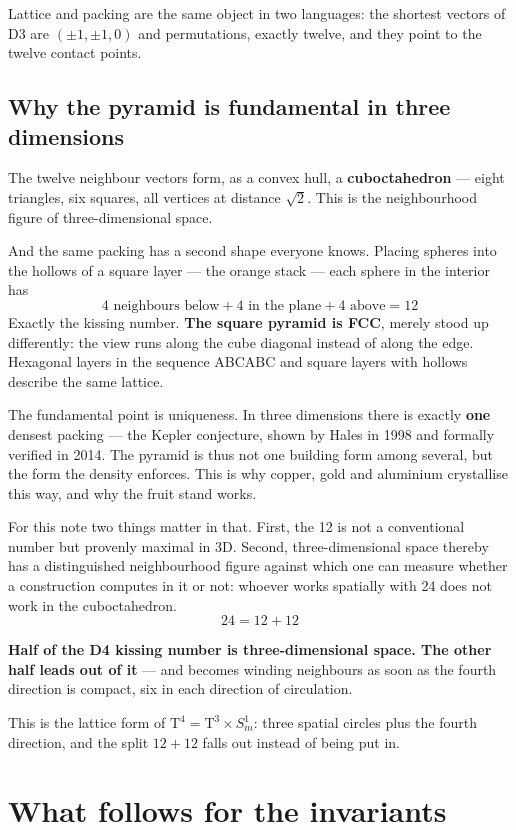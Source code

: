 \documentclass[11pt]{report}
\begin{document}
Lattice and packing are the same object in two languages: the shortest
vectors of D3 are $(\pm1, \pm1, 0)$ and permutations, exactly twelve,
and they point to the twelve contact points.

\section{Why the pyramid is fundamental in three dimensions}

The twelve neighbour vectors form, as a convex hull, a
\textbf{cuboctahedron} --- eight triangles, six squares, all vertices
at distance $\sqrt2$. This is the neighbourhood figure of
three-dimensional space.

And the same packing has a second shape everyone knows. Placing spheres
into the hollows of a square layer --- the orange stack --- each sphere
in the interior has
\[
  4 \text{ neighbours below} + 4 \text{ in the plane}
  + 4 \text{ above} = 12
\]
Exactly the kissing number. \textbf{The square pyramid is FCC}, merely
stood up differently: the view runs along the cube diagonal instead of
along the edge. Hexagonal layers in the sequence ABCABC and square
layers with hollows describe the same lattice.

The fundamental point is uniqueness. In three dimensions there is
exactly \textbf{one} densest packing --- the Kepler conjecture, shown
by Hales in 1998 and formally verified in 2014. The pyramid is thus not
one building form among several, but the form the density enforces.
This is why copper, gold and aluminium crystallise this way, and why
the fruit stand works.

For this note two things matter in that. First, the 12 is not a
conventional number but provenly maximal in 3D. Second,
three-dimensional space thereby has a distinguished neighbourhood
figure against which one can measure whether a construction computes in
it or not: whoever works spatially with 24 does not work in the
cuboctahedron.
\[
  24 = 12 + 12
\]

\textbf{Half of the D4 kissing number is three-dimensional space. The
other half leads out of it} --- and becomes winding neighbours as soon
as the fourth direction is compact, six in each direction of
circulation.

This is the lattice form of
$\text{T}^4 = \text{T}^3 \times S^1_m$: three spatial circles plus the
fourth direction, and the split $12 + 12$ falls out instead of being
put in.

\chapter{What follows for the invariants}
\end{document}

